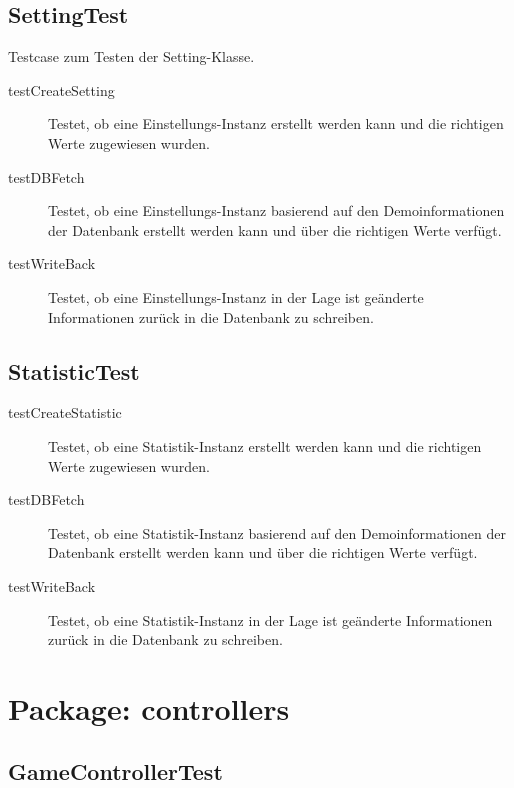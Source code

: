 \documentclass[parskip=full]{scrreprt}
\begin{document}
\subsection{SettingTest}

Testcase zum Testen der Setting-Klasse.

\begin{description}
	\item[testCreateSetting] Testet, ob eine Einstellungs-Instanz erstellt werden kann und die richtigen Werte zugewiesen wurden.
	\item[testDBFetch] Testet, ob eine Einstellungs-Instanz basierend auf den Demoinformationen der Datenbank erstellt werden kann und über die richtigen Werte verfügt.
	\item[testWriteBack] Testet, ob eine Einstellungs-Instanz in der Lage ist geänderte Informationen zurück in die Datenbank zu schreiben.
\end{description}

\subsection{StatisticTest}

\begin{description}
	\item[testCreateStatistic] Testet, ob eine Statistik-Instanz erstellt werden kann und die richtigen Werte zugewiesen wurden.
	\item[testDBFetch] Testet, ob eine Statistik-Instanz basierend auf den Demoinformationen der Datenbank erstellt werden kann und über die richtigen Werte verfügt.
	\item[testWriteBack] Testet, ob eine Statistik-Instanz in der Lage ist geänderte Informationen zurück in die Datenbank zu schreiben.
\end{description}

\clearpage

\section{Package: controllers}

\subsection{GameControllerTest}

\begin{description}
	\item 
\end{description}
\end{document}
